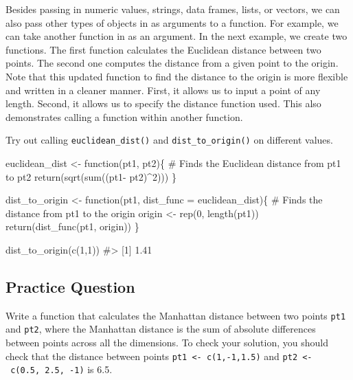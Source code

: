 \documentclass[
  letterpaper,
]{latex/krantz}
\makeatletter
\newenvironment{Shaded}{\begin{snugshade}}{\end{snugshade}}
\newcommand{\AttributeTok}[1]{\textcolor[rgb]{0.40,0.45,0.13}{#1}}
\newcommand{\CommentTok}[1]{\textcolor[rgb]{0.37,0.37,0.37}{#1}}
\newcommand{\ControlFlowTok}[1]{\textcolor[rgb]{0.00,0.23,0.31}{#1}}
\newcommand{\DecValTok}[1]{\textcolor[rgb]{0.68,0.00,0.00}{#1}}
\newcommand{\FunctionTok}[1]{\textcolor[rgb]{0.28,0.35,0.67}{#1}}
\newcommand{\NormalTok}[1]{\textcolor[rgb]{0.00,0.23,0.31}{#1}}
\newcommand{\OtherTok}[1]{\textcolor[rgb]{0.00,0.23,0.31}{#1}}
\newcommand{\SpecialCharTok}[1]{\textcolor[rgb]{0.37,0.37,0.37}{#1}}
\newenvironment{kframe}{%
\medskip{}
\setlength{\fboxsep}{.8em}
 \def\at@end@of@kframe{}%
 \ifinner\ifhmode%
  \def\at@end@of@kframe{\end{minipage}}%
  \begin{minipage}{\columnwidth}%
 \fi\fi%
 \def\FrameCommand##1{\hskip\@totalleftmargin \hskip-\fboxsep
 \colorbox{shadecolor}{##1}\hskip-\fboxsep
     \hskip-\linewidth \hskip-\@totalleftmargin \hskip\columnwidth}%
 \MakeFramed {\advance\hsize-\width
   \@totalleftmargin\z@ \linewidth\hsize
   \@setminipage}}%
 {\par\unskip\endMakeFramed%
 \at@end@of@kframe}
\renewenvironment{Shaded}{\begin{kframe}}{\end{kframe}}
\makeatother
\begin{document}
Besides passing in numeric values, strings, data frames, lists, or
vectors, we can also pass other types of objects in as arguments to a
function. For example, we can take another function in as an argument.
In the next example, we create two functions. The first function
calculates the Euclidean distance between two points. The second one
computes the distance from a given point to the origin. Note that this
updated function to find the distance to the origin is more flexible and
written in a cleaner manner. First, it allows us to input a point of any
length. Second, it allows us to specify the distance function used. This
also demonstrates calling a function within another function.

Try out calling \texttt{euclidean\_dist()} and
\texttt{dist\_to\_origin()} on different values.

\begin{Shaded}
\begin{Highlighting}[]
\NormalTok{euclidean\_dist }\OtherTok{\textless{}{-}} \ControlFlowTok{function}\NormalTok{(pt1, pt2)\{}
  \CommentTok{\# Finds the Euclidean distance from pt1 to pt2}
  \FunctionTok{return}\NormalTok{(}\FunctionTok{sqrt}\NormalTok{(}\FunctionTok{sum}\NormalTok{((pt1}\SpecialCharTok{{-}}\NormalTok{ pt2)}\SpecialCharTok{\^{}}\DecValTok{2}\NormalTok{)))}
\NormalTok{\}}

\NormalTok{dist\_to\_origin }\OtherTok{\textless{}{-}} \ControlFlowTok{function}\NormalTok{(pt1, }\AttributeTok{dist\_func =}\NormalTok{ euclidean\_dist)\{}
  \CommentTok{\# Finds the distance from pt1 to the origin}
\NormalTok{  origin }\OtherTok{\textless{}{-}} \FunctionTok{rep}\NormalTok{(}\DecValTok{0}\NormalTok{, }\FunctionTok{length}\NormalTok{(pt1))}
  \FunctionTok{return}\NormalTok{(}\FunctionTok{dist\_func}\NormalTok{(pt1, origin))}
\NormalTok{\}}

\FunctionTok{dist\_to\_origin}\NormalTok{(}\FunctionTok{c}\NormalTok{(}\DecValTok{1}\NormalTok{,}\DecValTok{1}\NormalTok{))}
\CommentTok{\#\textgreater{} [1] 1.41}
\end{Highlighting}
\end{Shaded}

\subsection{Practice Question}\label{practice-question-27}

Write a function that calculates the Manhattan distance between two
points \texttt{pt1} and \texttt{pt2}, where the Manhattan distance is
the sum of absolute differences between points across all the
dimensions. To check your solution, you should check that the distance
between points \texttt{pt1\ \textless{}-\ c(1,-1,1.5)} and
\texttt{pt2\ \textless{}-\ c(0.5,\ 2.5,\ -1)} is 6.5.
\end{document}
